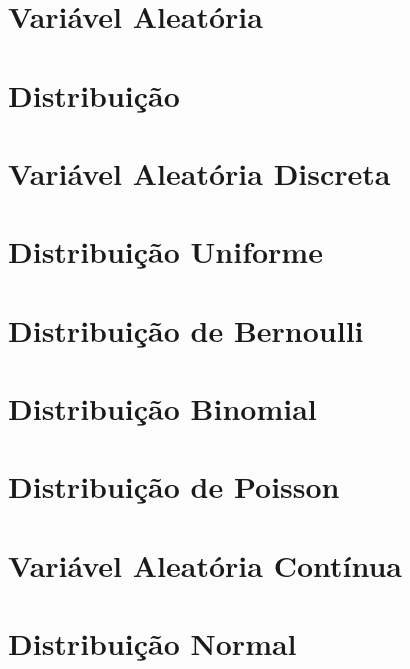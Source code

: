 \documentclass[
]{book}
\begin{document}
\hypertarget{variuxe1vel-aleatuxf3ria-1}{%
\section{Variável Aleatória}\label{variuxe1vel-aleatuxf3ria-1}}

\hypertarget{distribuiuxe7uxe3o}{%
\section{Distribuição}\label{distribuiuxe7uxe3o}}

\hypertarget{variuxe1vel-aleatuxf3ria-discreta}{%
\section{Variável Aleatória Discreta}\label{variuxe1vel-aleatuxf3ria-discreta}}

\hypertarget{distribuiuxe7uxe3o-uniforme}{%
\section{Distribuição Uniforme}\label{distribuiuxe7uxe3o-uniforme}}

\hypertarget{distribuiuxe7uxe3o-de-bernoulli}{%
\section{Distribuição de Bernoulli}\label{distribuiuxe7uxe3o-de-bernoulli}}

\hypertarget{distribuiuxe7uxe3o-binomial}{%
\section{Distribuição Binomial}\label{distribuiuxe7uxe3o-binomial}}

\hypertarget{distribuiuxe7uxe3o-de-poisson}{%
\section{Distribuição de Poisson}\label{distribuiuxe7uxe3o-de-poisson}}

\hypertarget{variuxe1vel-aleatuxf3ria-contuxednua}{%
\section{Variável Aleatória Contínua}\label{variuxe1vel-aleatuxf3ria-contuxednua}}

\hypertarget{distribuiuxe7uxe3o-normal}{%
\section{Distribuição Normal}\label{distribuiuxe7uxe3o-normal}}
\end{document}
